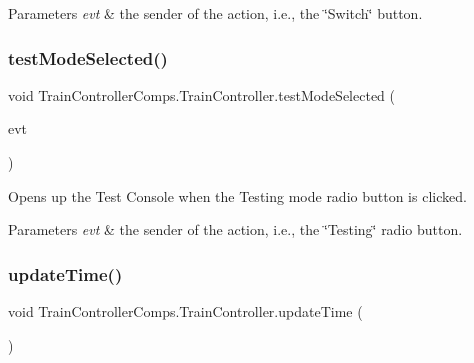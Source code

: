 \begin{DoxyParams}{Parameters}
{\em evt} & the sender of the action, i.\+e., the \char`\"{}\+Switch\char`\"{} button. \\
\hline
\end{DoxyParams}
\mbox{\label{classTrainControllerComps_1_1TrainController_abf8b94be97c22b9811d9103e880a58a3}} 
\subsubsection{\texorpdfstring{test\+Mode\+Selected()}{testModeSelected()}}
{\footnotesize\ttfamily void Train\+Controller\+Comps.\+Train\+Controller.\+test\+Mode\+Selected (\begin{DoxyParamCaption}\item[{java.\+awt.\+event.\+Action\+Event}]{evt }\end{DoxyParamCaption})\hspace{0.3cm}{\ttfamily [private]}}



Opens up the Test Console when the Testing mode radio button is clicked. 


\begin{DoxyParams}{Parameters}
{\em evt} & the sender of the action, i.\+e., the \char`\"{}\+Testing\char`\"{} radio button. \\
\hline
\end{DoxyParams}
\mbox{\label{classTrainControllerComps_1_1TrainController_a753f8f5e9ded45498bdf4188544ff8f9}} 
\subsubsection{\texorpdfstring{update\+Time()}{updateTime()}}
{\footnotesize\ttfamily void Train\+Controller\+Comps.\+Train\+Controller.\+update\+Time (\begin{DoxyParamCaption}{ }\end{DoxyParamCaption})\hspace{0.3cm}{\ttfamily [private]}}



